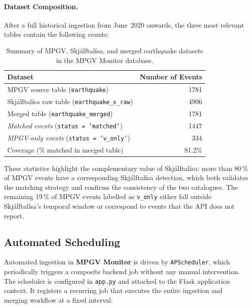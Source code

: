 \documentclass[12pt]{article}
\begin{document}
\paragraph{Dataset Composition.}

After a full historical ingestion from June~2020 onwards, the three most relevant tables contain the following counts:

\begin{table}[H]
\centering
\begin{tabular}{l r}
\hline
\textbf{Dataset} & \textbf{Number of Events} \\
\hline
MPGV source table (\texttt{earthquake})                    & 1781 \\
Skjálftalísa raw table (\texttt{earthquake\_s\_raw})       & 4906 \\
Merged table (\texttt{earthquake\_merged})                 & 1781 \\
\quad \textit{Matched events} (\texttt{status = 'matched'})   & 1447 \\
\quad \textit{MPGV-only events} (\texttt{status = 'v\_only'}) & 334  \\
\hline
Coverage (\% matched in merged table)                      & 81.2\% \\
\hline
\end{tabular}
\caption{Summary of MPGV, Skjálftalísa, and merged earthquake datasets in the MPGV Monitor database.}
\label{tab:data-coverage}
\end{table}

These statistics highlight the complementary value of Skjálftalísa: more than 80\,\% of MPGV events have a corresponding Skjálftalísa detection, which both validates the matching strategy and confirms the consistency of the two catalogues. The remaining 19\,\% of MPGV events labelled as \texttt{v\_only} either fall outside Skjálftalísa’s temporal window or correspond to events that the API does not report.

\subsection{Automated Scheduling}

Automated ingestion in \textbf{MPGV Monitor} is driven by \texttt{APScheduler}, which periodically triggers a composite backend job without any manual intervention. The scheduler is configured in \texttt{app.py} and attached to the Flask application context. It registers a recurring job that executes the entire ingestion and merging workflow at a fixed interval:
\end{document}
